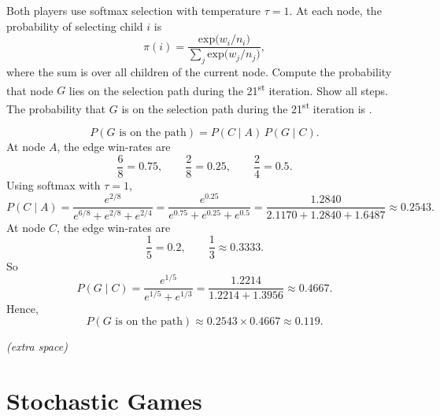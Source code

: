 \begin{enumerate}
\begin{figure}[H]
\end{figure}
\noindent
Both players use softmax selection with temperature $\tau = 1$. At each
node, the probability of selecting child $i$ is
\[
  \pi(i) = \frac{\text{exp}\bigl(w_i/n_i\bigr)}{\displaystyle\sum_j \text{exp}\bigl(w_j/n_j\bigr)},
\]
where the sum is over all children of the current node.
\medskip\noindent
Compute the probability that node $G$ lies on the selection path during the
21\textsuperscript{st} iteration. Show all steps.
\medskip\noindent
The probability that $G$ is on the selection path during the 21\textsuperscript{st} iteration is .
\begin{solution}
\[
P(G \text{ is on the path}) = P(C\mid A)\,P(G\mid C).
\]
At node $A$, the edge win-rates are
\[
\frac{6}{8}=0.75,\qquad \frac{2}{8}=0.25,\qquad \frac{2}{4}=0.5.
\]
Using softmax with $\tau=1$,
\[
P(C\mid A)=\frac{e^{2/8}}{e^{6/8}+e^{2/8}+e^{2/4}}
=\frac{e^{0.25}}{e^{0.75}+e^{0.25}+e^{0.5}}
=\frac{1.2840}{2.1170+1.2840+1.6487}
\approx 0.2543.
\]
At node $C$, the edge win-rates are
\[
\frac{1}{5}=0.2,\qquad \frac{1}{3}\approx 0.3333.
\]
So
\[
P(G\mid C)=\frac{e^{1/5}}{e^{1/5}+e^{1/3}}
=\frac{1.2214}{1.2214+1.3956}
\approx 0.4667.
\]
Hence,
\[
P(G \text{ is on the path}) \approx 0.2543 \times 0.4667 \approx 0.119.
\]
\end{solution}
\vspace{140pt}
\end{enumerate}
\clearpage
\begin{center}
    \textit{(extra space)}
\end{center}
\clearpage
\section{\points[14] Stochastic Games}
